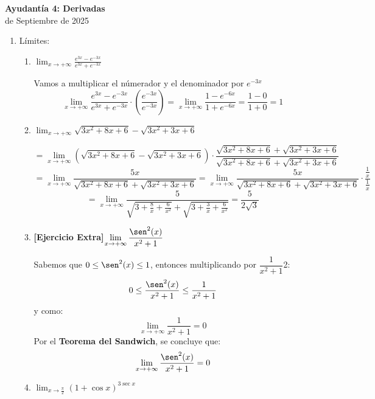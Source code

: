 \documentclass[letterpaper,12pt]{article}
\theoremstyle{plain}
\theoremstyle{definition}
\newcommand{\1}{\mathbbm{1}}
\begin{document}
\vspace{-0.2cm}
\begin{center}
\LARGE\textbf{Ayudantía 4: Derivadas}\\
\large {\fontsize{13}{14} de Septiembre de 2025}
\end{center}
\vspace{-0.2cm}
\begin{enumerate}[label=\textbf{P\arabic*.}, itemsep=0cm]
\item Límites:
\begin{enumerate}
 \item $\displaystyle \lim_{x \to +\infty} \frac{e^{3x} - e^{-3x}}{e^{3x} + e^{-3x}}$
 
 \vspace{0.5em}
 \color{blue}
      Vamos a multiplicar el númerador y el denominador por $e^{-3x}$
$$
\lim_{x \to +\infty} \frac{e^{3x} - e^{-3x}}{e^{3x} + e^{-3x}} \cdot \left(\dfrac{e^{-3x}}{e^{-3x}}\right) = \lim_{x \to +\infty} \frac{1 - e^{-6x}}{1 + e^{-6x}}
 = \frac{1 - 0}{1 + 0} = 1
$$
\color{black}
\item
$\displaystyle \lim_{x \to +\infty}  \sqrt{3x^2 + 8x + 6} - \sqrt{3x^2 + 3x + 6} $

 \vspace{0.5em}
 \color{blue}
\[
= \lim_{x \to +\infty} \left( \sqrt{3x^2 + 8x + 6} - \sqrt{3x^2 + 3x + 6} \right) \cdot \frac{\sqrt{3x^2 + 8x + 6} + \sqrt{3x^2 + 3x + 6}}{\sqrt{3x^2 + 8x + 6} + \sqrt{3x^2 + 3x + 6}}  
\]
\[
= \lim_{x \to +\infty} \frac{5x}{\sqrt{3x^2 + 8x + 6} + \sqrt{3x^2 + 3x + 6}} = \lim_{x \to +\infty} \frac{5x}{\sqrt{3x^2 + 8x + 6} + \sqrt{3x^2 + 3x + 6}} \cdot \frac{\frac{1}{x}}{\frac{1}{x}}
\]
\[
= \lim_{x \to +\infty} \frac{5}{\sqrt{3 + \frac{8}{x} + \frac{6}{x^2}} + \sqrt{3 + \frac{3}{x} + \frac{6}{x^2}}}
= \frac{5}{2\sqrt{3}}
\]
\color{black}
\item \textbf{[Ejercicio Extra]}$\displaystyle \lim_{x \to +\infty} \frac{\sen^2(x)}{x^2 + 1}$

 \vspace{0.5em}
 \color{blue}
    Sabemos que \( 0 \leq \sen^2(x) \leq 1 \), entonces multiplicando por $\dfrac{1}{x^2+1}$2:
\[
0 \leq \frac{\sen^2(x)}{x^2 + 1} \leq \frac{1}{x^2 + 1}
\]
y como:
\[
\lim_{x \to +\infty} \frac{1}{x^2 + 1} = 0
\]
Por el \textbf{Teorema del Sandwich}, se concluye que:
\[
\lim_{x \to +\infty} \frac{\sen^2(x)}{x^2 + 1} = 0
\]    
\color{black}

\item $\displaystyle \lim_{x \to \frac{\pi}{2}} (1 + \cos x)^{3 \sec x}$


\end{enumerate}
\end{enumerate}
\end{document}
